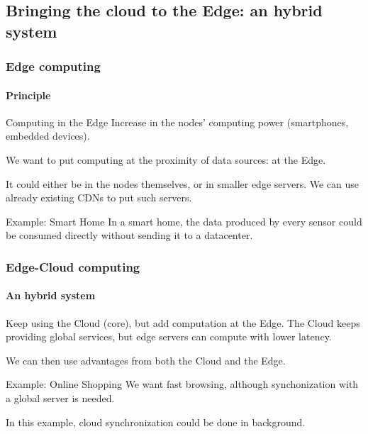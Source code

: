 \documentclass[utf8,xcolor=table, page number]{earlywinter}
\begin{document}
\subsection{Bringing the cloud to the Edge: an hybrid system} %
\begin{frame}
  \frametitle{Edge computing}
  \framesubtitle{Principle}

  \begin{block}{Computing in the Edge}
    Increase in the nodes' computing power (smartphones, embedded devices).
  \end{block}
   We want to put computing at the proximity of data sources: at the Edge.

   It could either be in the nodes themselves, or in smaller edge servers. We can use already existing CDNs to put such servers.
  
   \begin{exampleblock}{Example: Smart Home}
     In a smart home, the data produced by every sensor could be consumed directly without sending it to a datacenter.
   \end{exampleblock}

\end{frame}

\begin{frame}
  \frametitle{Edge-Cloud computing}
  \framesubtitle{An hybrid system}

%
  Keep using the Cloud (core), but add computation at the Edge.
  The Cloud keeps providing global services, but edge servers can compute with lower latency.

  We can then use advantages from both the Cloud and the Edge.
  
  \begin{exampleblock}{Example: Online Shopping}
    We want fast browsing, although synchonization with a global server is needed.
  \end{exampleblock}

  In this example, cloud synchronization could be done in background.
  
\end{frame}
\end{document}
